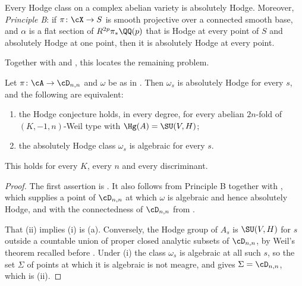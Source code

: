 \begin{theorem}\label{thm:deligneAH}
Every Hodge class on a complex abelian variety is absolutely Hodge. Moreover,
\emph{Principle B}: if $\pi\colon\cX\to S$ is smooth projective over a
connected smooth base, and $\alpha$ is a flat section of $R^{2p}\pi_{*}\QQ(p)$
that is Hodge at every point of $S$ and absolutely Hodge at one point, then it
is absolutely Hodge at every point.
\end{theorem}

Together with  and , this locates
the remaining problem.

\begin{corollary}\label{cor:exactform}
Let $\pi\colon\cA\to\cD_{n,n}$ and $\omega$ be as in . Then
$\omega_{s}$ is absolutely Hodge for every $s$, and the following are
equivalent:
\begin{enumerate}[label=\textup{(\roman*)},nosep]
\item the Hodge conjecture holds, in every degree, for every abelian
  $2n$-fold of $(K,-1,n)$-Weil type with $\Hg(A)=\SU(V,H)$;
\item the absolutely Hodge class $\omega_{s}$ is algebraic for every $s$.
\end{enumerate}
This holds for every $K$, every $n$ and every discriminant.
\end{corollary}

\begin{proof}
The first assertion is . It also follows from Principle B
together with , which supplies a point of $\cD_{n,n}$ at
which $\omega$ is algebraic and hence absolutely Hodge, and with the
connectedness of $\cD_{n,n}$ from .

That (ii) implies (i) is (a). Conversely, the Hodge group
of $A_{s}$ is $\SU(V,H)$ for $s$ outside a countable union of proper closed
analytic subsets of $\cD_{n,n}$, by Weil's theorem \cite{Weil77} recalled
before . Under (i) the class $\omega_{s}$ is algebraic at
all such $s$, so the set $\Sigma$ of points at which it is algebraic is not
meagre, and  gives $\Sigma=\cD_{n,n}$, which is (ii).
\end{proof}
